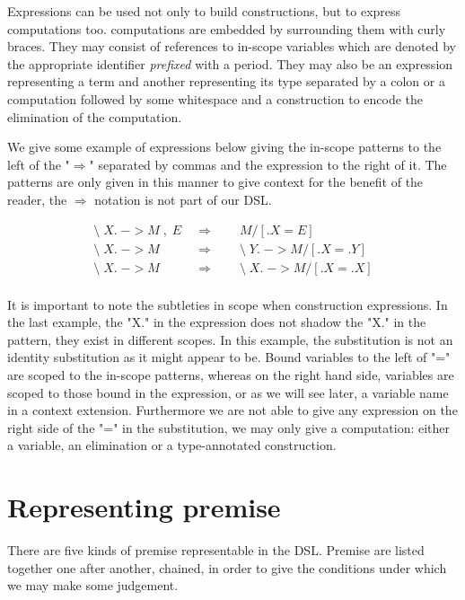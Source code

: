 Expressions can be used not only to build constructions, but to
express computations too. computations are embedded by surrounding
them with curly braces. They may consist of references to in-scope
variables which are denoted by the appropriate identifier
\emph{prefixed} with a period. They may also be an expression
representing a term and another representing its type separated by a
colon or a computation followed by some whitespace and a construction
to encode the elimination of the computation.

We give some example of expressions below giving the in-scope patterns
to the left of the "$\Rightarrow$" separated by commas and the
expression to the right of it. The patterns are only given in this
manner to give context for the benefit of the reader, the
$\Rightarrow$ notation is not part of our DSL.

\begin{align*}
  \mbox{\textbackslash}\; X. \; -> M \; , \; E \;
  &\Rightarrow \qquad M/[.X =
    E] \\
  \mbox{\textbackslash}\; X. \; -> M \;
  &\Rightarrow \qquad \mbox{\textbackslash}\; Y. \; -> M/[.X = .Y] \\
  \mbox{\textbackslash}\; X. \; -> M \;
  &\Rightarrow \qquad \mbox{\textbackslash}\; X. \; -> M/[.X = .X] \\  
\end{align*}

It is important to note the subtleties in scope when construction
expressions. In the last example, the "X." in the expression does not
shadow the "X." in the pattern, they exist in different scopes. In
this example, the substitution is not an identity substitution as it
might appear to be. Bound variables to the left of "=" are scoped to
the in-scope patterns, whereas on the right hand side, variables are
scoped to those bound in the expression, or as we will see later, a
variable name in a context extension. Furthermore we are not able
to give any expression on the right side of the "=" in the
substitution, we may only give a computation: either a variable, an
elimination or a type-annotated construction.

\section{Representing premise}

There are five kinds of premise representable in the DSL. Premise are
listed together one after another, chained, in order to give the
conditions under which we may make some judgement.

